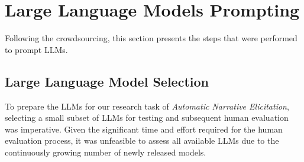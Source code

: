 \section{Large Language Models Prompting}
Following the crowdsourcing, this section presents the steps that were performed to prompt LLMs.
\subsection{Large Language Model Selection}
To prepare the LLMs for our research task of  \emph{Automatic Narrative Elicitation}, selecting a small subset of LLMs for testing and subsequent human evaluation was imperative. Given the significant time and effort required for the human evaluation process, it was unfeasible to assess all available LLMs due to the continuously growing number of newly released models.

